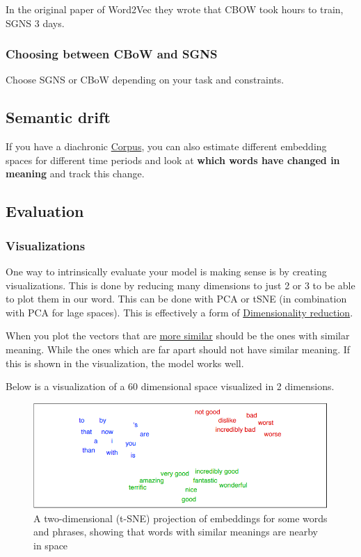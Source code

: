 \documentclass[
  11pt,
  british,
]{article}
\begin{document}
In the original paper of Word2Vec they wrote that CBOW took hours to
train, SGNS 3 days.

\hypertarget{choosing-between-cbow-and-sgns}{%
\subsubsection{Choosing between CBoW and
SGNS}\label{choosing-between-cbow-and-sgns}}

Choose SGNS or CBoW depending on your task and constraints.

\hypertarget{semantic-drift}{%
\subsection{Semantic drift}\label{semantic-drift}}

If you have a diachronic \href{../Data/Corpus.md}{Corpus}, you can also
estimate different embedding spaces for different time periods and look
at \textbf{which words have changed in meaning} and track this change.

\hypertarget{evaluation}{%
\subsection{Evaluation}\label{evaluation}}

\hypertarget{visualizations}{%
\subsubsection{Visualizations}\label{visualizations}}

One way to intrinsically evaluate your model is making sense is by
creating visualizations. This is done by reducing many dimensions to
just 2 or 3 to be able to plot them in our word. This can be done with
PCA or tSNE (in combination with PCA for lage spaces). This is
effectively a form of
\href{Dimensionality\%20reduction.md}{Dimensionality reduction}.

When you plot the vectors that are \href{Similarity.md}{more similar}
should be the ones with similar meaning. While the ones which are far
apart should not have similar meaning. If this is shown in the
visualization, the model works well.

Below is a visualization of a 60 dimensional space visualized in 2
dimensions.

\begin{figure}
\centering
\includegraphics{Pasted_image_20220601145459.png}
\caption{A two-dimensional (t-SNE) projection of embeddings for some
words and phrases, showing that words with similar meanings are nearby
in space}
\end{figure}
\end{document}
